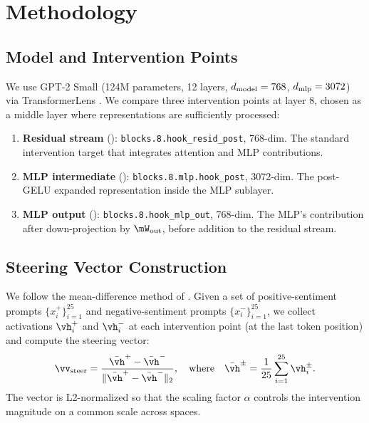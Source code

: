 \section{Methodology}
\label{sec:method}

\subsection{Model and Intervention Points}

We use GPT-2 Small \citep{radford2019language} (124M parameters, 12 layers, $d_{\text{model}} = 768$, $d_{\text{mlp}} = 3072$) via TransformerLens \citep{nanda2022transformerlens}. We compare three intervention points at layer 8, chosen as a middle layer where representations are sufficiently processed:

\begin{enumerate}[leftmargin=*,itemsep=0pt,topsep=0pt]
    \item \textbf{Residual stream} (\residstream): \texttt{blocks.8.hook\_resid\_post}, 768-dim. The standard intervention target that integrates attention and MLP contributions.
    \item \textbf{MLP intermediate} (\mlpinter): \texttt{blocks.8.mlp.hook\_post}, 3072-dim. The post-GELU expanded representation inside the MLP sublayer.
    \item \textbf{MLP output} (\mlpout): \texttt{blocks.8.hook\_mlp\_out}, 768-dim. The MLP's contribution after down-projection by $\mW_{\text{out}}$, before addition to the residual stream.
\end{enumerate}

\subsection{Steering Vector Construction}

We follow the mean-difference method of \citet{turner2023activation}. Given a set of positive-sentiment prompts $\{x_i^+\}_{i=1}^{25}$ and negative-sentiment prompts $\{x_i^-\}_{i=1}^{25}$, we collect activations $\vh_i^+$ and $\vh_i^-$ at each intervention point (at the last token position) and compute the steering vector:
\begin{equation}
    \sv = \frac{\bar{\vh}^+ - \bar{\vh}^-}{\|\bar{\vh}^+ - \bar{\vh}^-\|_2}, \quad \text{where} \quad \bar{\vh}^{\pm} = \frac{1}{25}\sum_{i=1}^{25} \vh_i^{\pm}.
    \label{eq:sv}
\end{equation}
The vector is L2-normalized so that the scaling factor $\alpha$ controls the intervention magnitude on a common scale across spaces.

